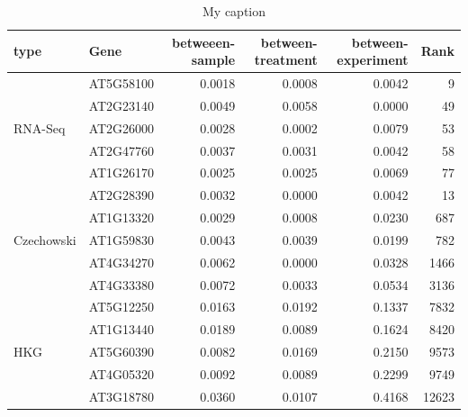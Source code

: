 \documentclass[11pt, a4paper]{article}
\begin{document}
\begin{table}[]
	\centering
	\caption{My caption}
	\label{table:15genes}
	\begin{tabular}{llrrrr}\\ \hline
		type                        & Gene      & betweeen-sample & between-treatment & between-experiment & Rank  \\  \hline
		\multirow{5}{*}{RNA-Seq}    & AT5G58100 & 0.0018          & 0.0008            & 0.0042             & 9     \\
		& AT2G23140 & 0.0049          & 0.0058            & 0.0000             & 49    \\
		& AT2G26000 & 0.0028          & 0.0002            & 0.0079             & 53    \\
		& AT2G47760 & 0.0037          & 0.0031            & 0.0042             & 58    \\
		& AT1G26170 & 0.0025          & 0.0025            & 0.0069             & 77    \\  \hline
		\multirow{5}{*}{Czechowski} & AT2G28390 & 0.0032          & 0.0000            & 0.0042             & 13    \\
		& AT1G13320 & 0.0029          & 0.0008            & 0.0230             & 687   \\
		& AT1G59830 & 0.0043          & 0.0039            & 0.0199             & 782   \\
		& AT4G34270 & 0.0062          & 0.0000            & 0.0328             & 1466  \\
		& AT4G33380 & 0.0072          & 0.0033            & 0.0534             & 3136  \\   \hline
	 \multirow{5}{*}{HKG}              & AT5G12250 & 0.0163          & 0.0192            & 0.1337             & 7832  \\   
		& AT1G13440 & 0.0189          & 0.0089            & 0.1624             & 8420  \\
		& AT5G60390 & 0.0082          & 0.0169            & 0.2150             & 9573  \\
		& AT4G05320 & 0.0092          & 0.0089            & 0.2299             & 9749  \\
		& AT3G18780 & 0.0360          & 0.0107            & 0.4168             & 12623  \\   \hline
	\end{tabular}
\end{table}
\end{document}
